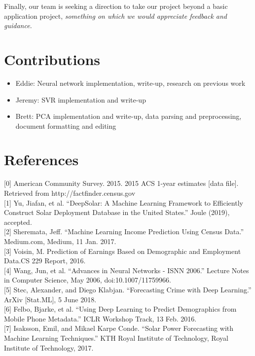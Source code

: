 \documentclass{article}
\begin{document}
	Finally, our team is seeking a direction to take our project beyond a basic application project, \textit{something on which we would appreciate feedback and guidance.}
	
	\section*{Contributions}
		\begin{itemize}[noitemsep,nolistsep]
			\item Eddie: Neural network implementation, write-up, research on previous work
			\item Jeremy: SVR implementation and write-up
			\item Brett: PCA implementation and write-up, data parsing and preprocessing, document formatting and editing
		\end{itemize}
	
	\section*{References}
	\smallskip
	\scriptsize
	\setlength{\parindent}{0in}
	[0] American Community Survey. 2015.  2015 ACS 1-year estimates [data file]. Retrieved from http://factfinder.census.gov\\ [0.5pt]
	
	[1] Yu, Jiafan, et al. “DeepSolar: A Machine Learning Framework to Efficiently Construct Solar Deployment Database in the United States.” Joule (2019), accepted.\\ [0.5pt]
	
	[2] Sheremata, Jeff. “Machine Learning Income Prediction Using Census Data.” Medium.com, Medium, 11 Jan. 2017.\\ [0.5pt]
	
	[3] Voisin, M. Prediction of Earnings Based on Demographic and Employment Data.CS 229 Report, 2016.\\ [0.5pt]
	
	[4] Wang, Jun, et al. “Advances in Neural Networks - ISNN 2006.” Lecture Notes in Computer Science, May 2006, doi:10.1007/11759966.\\ [0.5pt]
	
	[5] Stec, Alexander, and Diego Klabjan. “Forecasting Crime with Deep Learning.” ArXiv [Stat.ML], 5 June 2018.\\ [0.5pt]
	
	[6] Felbo, Bjarke, et al. “Using Deep Learning to Predict Demographics from Mobile Phone Metadata.” ICLR Workshop Track, 13 Feb. 2016.\\ [0.5pt]
	
	[7] Isaksson, Emil, and Mikael Karpe Conde. “Solar Power Forecasting with Machine Learning Techniques.” KTH Royal Institute of Technology, Royal Institute of Technology, 2017.\\ [0.5pt]
\end{document}

